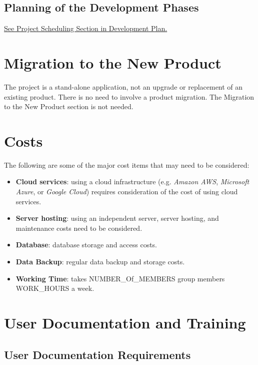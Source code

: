 \documentclass[12pt]{article}
\begin{document}
\subsection{Planning of the Development Phases}
\href{https://github.com/wangq131/4G06CapstoneProjectT5/blob/main/docs/DevelopmentPlan/DevelopmentPlan.tex#L194C1-L245C16}{See Project Scheduling Section in Development Plan.}

\section{Migration to the New Product}
The project is a stand-alone application, not an upgrade or replacement of an existing product. There is no need to involve a product migration. The Migration to the New Product section is not needed.

\section{Costs}
The following are some of the major cost items that may need to be considered:

\begin{itemize} 
  \item \textbf{Cloud services}: using a cloud infrastructure (e.g. \textit{Amazon AWS}, \textit{Microsoft Azure}, or \textit{Google Cloud}) requires consideration of the cost of using cloud services.
  \item \textbf{Server hosting}: using an independent server, server hosting, and maintenance costs need to be considered.
  \item \textbf{Database}: database storage and access costs.
  \item \textbf{Data Backup}: regular data backup and storage costs.
  \item \textbf{Working Time}: takes NUMBER\_Of\_MEMBERS group members WORK\_HOURS a week.
\end{itemize}

\section{User Documentation and Training}
\subsection{User Documentation Requirements}
\end{document}
